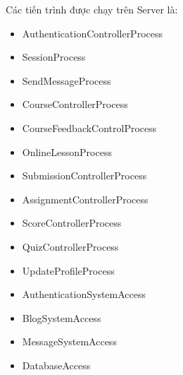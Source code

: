\documentclass[./../main.tex]{subfiles}
\begin{document}
	Các tiến trình được chạy trên Server là:
	\begin{itemize}
		\item AuthenticationControllerProcess
		\item SessionProcess
		\item SendMessageProcess
		\item CourseControllerProcess
		\item CourseFeedbackControlProcess
		\item OnlineLessonProcess
		\item SubmissionControllerProcess
		\item AssignmentControllerProcess
		\item ScoreControllerProcess
		\item QuizControllerProcess
		\item UpdateProfileProcess
		\item AuthenticationSystemAccess
		\item BlogSystemAccess
		\item MessageSystemAccess
		\item DatabaseAccess     
	\end{itemize}	
	
\end{document}
